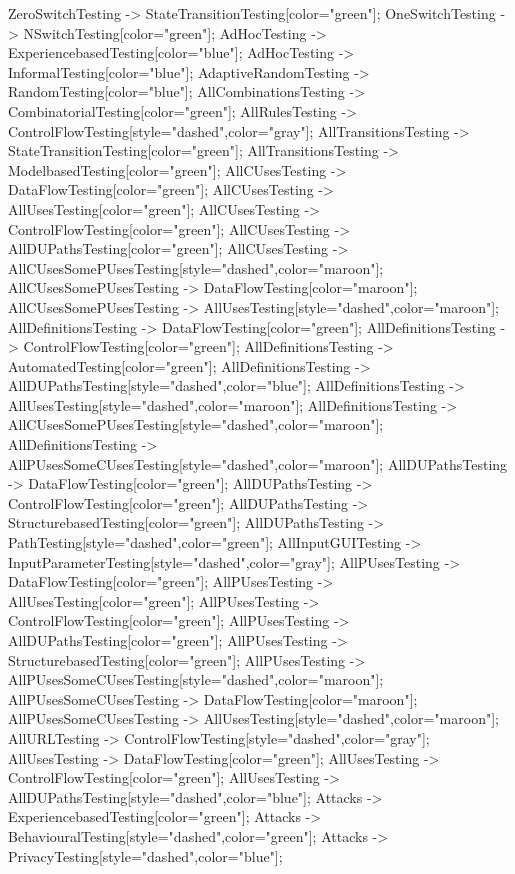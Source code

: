 \documentclass{article}
\begin{document}
{ZeroSwitchTesting -> StateTransitionTesting[color="green"];
OneSwitchTesting -> NSwitchTesting[color="green"];
AdHocTesting -> ExperiencebasedTesting[color="blue"];
AdHocTesting -> InformalTesting[color="blue"];
AdaptiveRandomTesting -> RandomTesting[color="blue"];
AllCombinationsTesting -> CombinatorialTesting[color="green"];
AllRulesTesting -> ControlFlowTesting[style="dashed",color="gray"];
AllTransitionsTesting -> StateTransitionTesting[color="green"];
AllTransitionsTesting -> ModelbasedTesting[color="green"];
AllCUsesTesting -> DataFlowTesting[color="green"];
AllCUsesTesting -> AllUsesTesting[color="green"];
AllCUsesTesting -> ControlFlowTesting[color="green"];
AllCUsesTesting -> AllDUPathsTesting[color="green"];
AllCUsesTesting -> AllCUsesSomePUsesTesting[style="dashed",color="maroon"];
AllCUsesSomePUsesTesting -> DataFlowTesting[color="maroon"];
AllCUsesSomePUsesTesting -> AllUsesTesting[style="dashed",color="maroon"];
AllDefinitionsTesting -> DataFlowTesting[color="green"];
AllDefinitionsTesting -> ControlFlowTesting[color="green"];
AllDefinitionsTesting -> AutomatedTesting[color="green"];
AllDefinitionsTesting -> AllDUPathsTesting[style="dashed",color="blue"];
AllDefinitionsTesting -> AllUsesTesting[style="dashed",color="maroon"];
AllDefinitionsTesting -> AllCUsesSomePUsesTesting[style="dashed",color="maroon"];
AllDefinitionsTesting -> AllPUsesSomeCUsesTesting[style="dashed",color="maroon"];
AllDUPathsTesting -> DataFlowTesting[color="green"];
AllDUPathsTesting -> ControlFlowTesting[color="green"];
AllDUPathsTesting -> StructurebasedTesting[color="green"];
AllDUPathsTesting -> PathTesting[style="dashed",color="green"];
AllInputGUITesting -> InputParameterTesting[style="dashed",color="gray"];
AllPUsesTesting -> DataFlowTesting[color="green"];
AllPUsesTesting -> AllUsesTesting[color="green"];
AllPUsesTesting -> ControlFlowTesting[color="green"];
AllPUsesTesting -> AllDUPathsTesting[color="green"];
AllPUsesTesting -> StructurebasedTesting[color="green"];
AllPUsesTesting -> AllPUsesSomeCUsesTesting[style="dashed",color="maroon"];
AllPUsesSomeCUsesTesting -> DataFlowTesting[color="maroon"];
AllPUsesSomeCUsesTesting -> AllUsesTesting[style="dashed",color="maroon"];
AllURLTesting -> ControlFlowTesting[style="dashed",color="gray"];
AllUsesTesting -> DataFlowTesting[color="green"];
AllUsesTesting -> ControlFlowTesting[color="green"];
AllUsesTesting -> AllDUPathsTesting[style="dashed",color="blue"];
Attacks -> ExperiencebasedTesting[color="green"];
Attacks -> BehaviouralTesting[style="dashed",color="green"];
Attacks -> PrivacyTesting[style="dashed",color="blue"];
}
\end{document}

